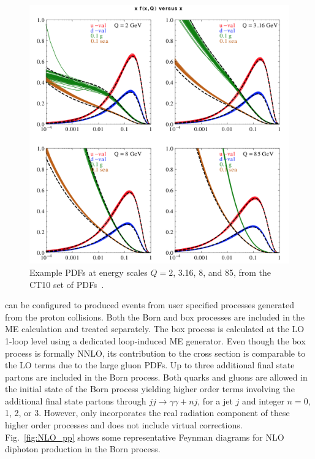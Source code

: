 \begin{figure}[!htbp]
  \centering
  \includegraphics[scale=0.50]{figures/ct10_pdf}
  \caption{Example PDFs at energy scales $Q=2$, 3.16, 8, and 85\GeV, from the CT10 set of PDFs~\cite{Gao:2013xoa}.}
  \label{fig:ct10_pdf}
\end{figure}

\SHERPA can be configured to produced events from user specified processes generated from the proton collisions. Both the Born and box processes are included in the \SHERPA ME calculation and treated separately. The box process is calculated at the LO 1-loop level using a dedicated loop-induced ME generator. Even though the box process is formally NNLO, its contribution to the cross section is comparable to the LO terms due to the large gluon PDFs. Up to three additional final state partons are included in the Born process. Both quarks and gluons are allowed in the initial state of the Born process yielding higher order terms involving the additional final state partons through $jj\to\gamma\gamma+nj$, for a jet $j$ and integer $n=0$, 1, 2, or 3. However, \SHERPA only incorporates the real radiation component of these higher order processes and does not include virtual corrections. Fig.~\ref{fig:NLO_pp} shows some representative Feynman diagrams for NLO diphoton production in the Born process. 

